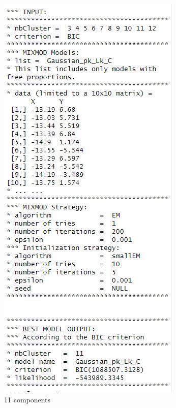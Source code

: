 \documentclass[11pt,a4paper,]{article}
\begin{document}
\begin{figure}

{\centering \includegraphics[width=1\linewidth]{image/clustout} 

}

\caption{11 components}\label{fig:clusout}
\end{figure}
\end{document}
